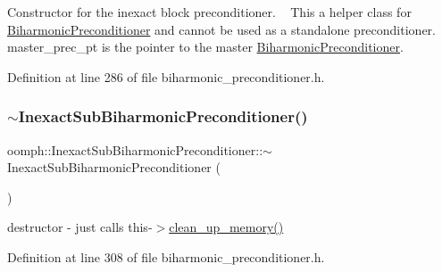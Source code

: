 Constructor for the inexact block preconditioner. ~\newline
This a helper class for \hyperlink{classoomph_1_1BiharmonicPreconditioner}{Biharmonic\+Preconditioner} and cannot be used as a standalone preconditioner. ~\newline
master\+\_\+prec\+\_\+pt is the pointer to the master \hyperlink{classoomph_1_1BiharmonicPreconditioner}{Biharmonic\+Preconditioner}. 



Definition at line 286 of file biharmonic\+\_\+preconditioner.\+h.

\mbox{\label{classoomph_1_1InexactSubBiharmonicPreconditioner_a9c2031d51b753695f23b4ffb3bb41ecf}} 
\subsubsection{\texorpdfstring{$\sim$\+Inexact\+Sub\+Biharmonic\+Preconditioner()}{~InexactSubBiharmonicPreconditioner()}}
{\footnotesize\ttfamily oomph\+::\+Inexact\+Sub\+Biharmonic\+Preconditioner\+::$\sim$\+Inexact\+Sub\+Biharmonic\+Preconditioner (\begin{DoxyParamCaption}{ }\end{DoxyParamCaption})\hspace{0.3cm}{\ttfamily [inline]}}



destructor -\/ just calls this-\/$>$\hyperlink{classoomph_1_1InexactSubBiharmonicPreconditioner_a5a8e4b8f01a5192066f1ac095845f308}{clean\+\_\+up\+\_\+memory()} 



Definition at line 308 of file biharmonic\+\_\+preconditioner.\+h.

\mbox{\label{classoomph_1_1InexactSubBiharmonicPreconditioner_a4753eaf54d7abf2fbd64c28d60b851de}} 
